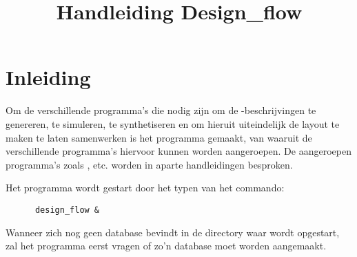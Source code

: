 \title{Handleiding Design\_flow}
\maketitle

\section{Inleiding}
Om de verschillende programma's die nodig zijn om de -beschrijvingen te
genereren, te simule\-ren, te synthetiseren en om hieruit uiteindelijk de
layout te maken te laten samenwerken is het programma 
gemaakt, van waaruit de verschillende programma's hiervoor kunnen
worden aangeroepen. De aangeroepen programma's
zoals ,  etc. worden in aparte handleidingen besproken.

Het programma  wordt gestart door het typen van het commando:
\begin{verbatim}
      design_flow &
\end{verbatim}
Wanneer zich nog geen database bevindt in de directory waar 
wordt opgestart, zal het programma eerst vragen of zo'n database moet worden
aangemaakt.

